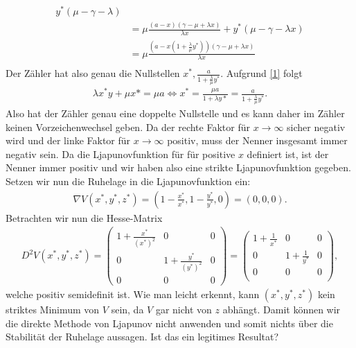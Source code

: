 \begin{solution}
\begin{align*}
  y^*(\mu - \gamma - \lambda) \\
  &=\mu \frac{(a-x)(\gamma - \mu + \lambda x)}{\lambda x} + y^*(\mu - \gamma - \lambda x) \\
  &= \mu \frac{(a-x(1+\frac{\lambda}{\mu} y^*))(\gamma - \mu + \lambda x)}{\lambda x} \\
\end{align*}
Der Zähler hat also genau die Nullstellen $x^*, \frac{a}{1 + \frac{\lambda}{\mu}y^*}$.
Aufgrund \eqref{1} folgt
\begin{align*}
  \lambda x^*y + \mu x* = \mu a \iff x^* = \frac{\mu a}{1 + \lambda y*} = \frac{a}{1 + \frac{\lambda}{\mu}y^*}.
\end{align*}
Also hat der Zähler genau eine doppelte Nullstelle und
es kann daher im Zähler keinen Vorzeichenwechsel geben. Da der rechte Faktor für $x \to \infty$ sicher negativ wird
und der linke Faktor für $x \to \infty$ positiv, muss der Nenner insgesamt immer negativ sein.
Da die Ljapunovfunktion für für positive $x$ definiert ist, ist der Nenner immer positiv
und wir haben also eine strikte Ljapunovfunktion gegeben. \\
Setzen wir nun die Ruhelage in die Ljapunovfunktion ein:
\begin{align*}
  \nabla V(x^*,y^*,z^*) = \left(1 - \frac{x^*}{x^*}, 1 - \frac{y^*}{y^*}, 0\right) = (0,0,0).
\end{align*}
Betrachten wir nun die Hesse-Matrix
\begin{align*}
  D^2 V(x^*,y^*,z^*) = \begin{pmatrix}
    1 + \frac{x^*}{(x^*)^2} & 0 & 0 \\
    0 & 1 + \frac{y^*}{(y^*)^2} & 0 \\
    0 & 0 & 0
  \end{pmatrix}
  = \begin{pmatrix}
    1 + \frac{1}{x^*} & 0 & 0\\
    0 & 1 + \frac{1}{y^*} & 0 \\
    0 & 0 & 0 \\
  \end{pmatrix},
\end{align*}
welche positiv semidefinit ist. Wie man leicht erkennt, kann $(x^*,y^*,z^*)$ kein
striktes Minimum von $V$ sein, da $V$ gar nicht von $z$ abhängt. Damit können wir
die direkte Methode von Ljapunov nicht anwenden und somit nichts über die Stabilität
der Ruhelage aussagen. Ist das ein legitimes Resultat?
\end{solution}
